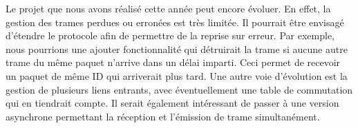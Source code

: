 \documentclass[a4paper,11pt]{article}
\begin{document}
Le projet que nous avons réalisé cette année peut encore évoluer.
En effet, la gestion des trames perdues ou erronées est très limitée.
Il pourrait être envisagé d'étendre le protocole afin de permettre de la
reprise sur erreur. Par exemple, nous pourrions une ajouter fonctionnalité qui détruirait la trame si aucune autre trame du même paquet 
n'arrive dans un délai imparti. Ceci permet de recevoir un paquet de
même ID qui arriverait plus tard. Une autre voie d'évolution est la
gestion de plusieurs liens entrants, avec éventuellement une table de
commutation qui en tiendrait compte. Il serait également intéressant de
passer à une version asynchrone permettant la réception et l'émission de
trame simultanément.
\end{document}

